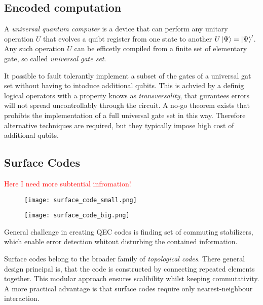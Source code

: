 \subsection{Encoded computation}
A \textit{universal quantum computer} is a device that can perform any unitary operation $U$ that evolves a quibt register from one state to another $U\ket{\Psi} = \ket{\Psi}'$.
Any such operation $U$ can be efficetly compiled from a finite set of elementary gate, so called \textit{universal gate set}. \cite{QECintro}

It possible to fault tolerantly implement a subset of the gates of a universal gat set without having to intoduce additional qubits. 
This is achvied by a definig logical operators with a property knows as \textit{transversality}, that gurantees errors will not spread uncontrollably through the circuit.
A no-go theorem exists that prohibts the implementation of a full universal gate set in this way. 
Therefore alternative techniques are required, but they typically impose high cost of additional qubits. \cite{QECintro}


\subsection{Surface Codes}
\textcolor{red}{Here I need more subtential infromation!}
\begin{figure}[h]
    \begin{center}
        \texttt{[image: surface\_code\_small.png]}
    \end{center}
    \label{fig:basic.qc.surface_code_small}
\end{figure}
\begin{figure}[h]
    \begin{center}
        \texttt{[image: surface\_code\_big.png]}
    \end{center}
    \label{fig:basic.qc.surface_code_big}
\end{figure}
General challenge in creating QEC codes is finding set of commuting stabilizers, 
which enable error detection whitout disturbing the contained information.

Surface codes belong to the broader family of \textit{topological codes}.
There general design principal is, that the code is constructed by connecting repeated elements together. 
This modular approach ensures scalibility whilst keeping commutativity.
A more practical advantage is that surface codes require only nearest-neighbour interaction. \cite{QECintro}

